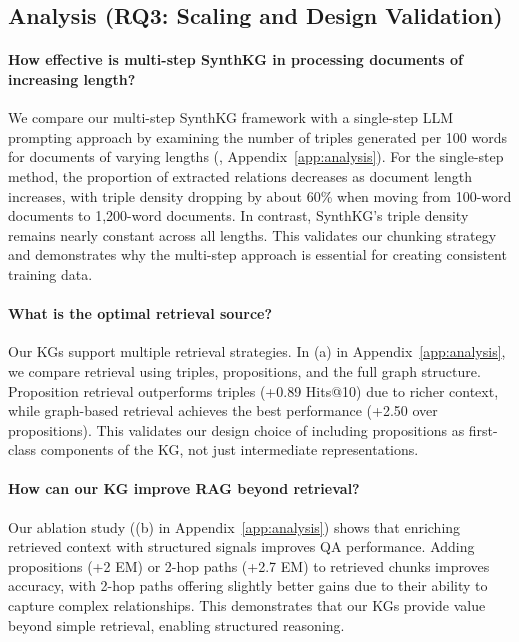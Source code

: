 \documentclass{article} %
\begin{document}
\subsection{Analysis (RQ3: Scaling and Design Validation)} \label{sec:analysis}
\paragraph{How effective is multi-step SynthKG in processing documents of increasing length?}
We compare our multi-step SynthKG framework with a single-step LLM prompting approach by examining the number of triples generated per 100 words for documents of varying lengths (, Appendix~\ref{app:analysis}). For the single-step method, the proportion of extracted relations decreases as document length increases, with triple density dropping by about 60\% when moving from 100-word documents to 1,200-word documents. In contrast, SynthKG's triple density remains nearly constant across all lengths. This validates our chunking strategy and demonstrates why the multi-step approach is essential for creating consistent training data.

\paragraph{What is the optimal retrieval source?}
Our KGs support multiple retrieval strategies. In (a) in Appendix~\ref{app:analysis}, we compare retrieval using triples, propositions, and the full graph structure. Proposition retrieval outperforms triples (+0.89 Hits@10) due to richer context, while graph-based retrieval achieves the best performance (+2.50 over propositions). This validates our design choice of including propositions as first-class components of the KG, not just intermediate representations.

\paragraph{How can our KG improve RAG beyond retrieval?}
Our ablation study ((b) in Appendix~\ref{app:analysis}) shows that enriching retrieved context with structured signals improves QA performance. Adding propositions (+2 EM) or 2-hop paths (+2.7 EM) to retrieved chunks improves accuracy, with 2-hop paths offering slightly better gains due to their ability to capture complex relationships. This demonstrates that our KGs provide value beyond simple retrieval, enabling structured reasoning.
\end{document}
